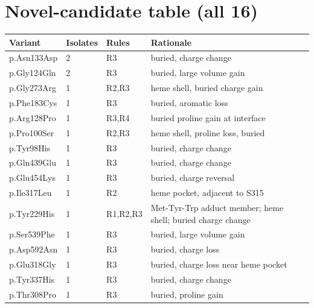 \documentclass[11pt]{article}
\begin{document}
\section{Novel-candidate table (all 16)}
\begin{center}\small
\begin{tabular}{llll}
\hline
Variant & Isolates & Rules & Rationale\\
\hline
p.Asn133Asp & 2 & R3 & buried, charge change\\
p.Gly124Gln & 2 & R3 & buried, large volume gain\\
p.Gly273Arg & 1 & R2,R3 & heme shell, buried charge gain\\
p.Phe183Cys & 1 & R3 & buried, aromatic loss\\
p.Arg128Pro & 1 & R3,R4 & buried proline gain at interface\\
p.Pro100Ser & 1 & R2,R3 & heme shell, proline loss, buried\\
p.Tyr98His & 1 & R3 & buried, charge change\\
p.Gln439Glu & 1 & R3 & buried, charge change\\
p.Glu454Lys & 1 & R3 & buried, charge reversal\\
p.Ile317Leu & 1 & R2 & heme pocket, adjacent to S315\\
p.Tyr229His & 1 & R1,R2,R3 & Met-Tyr-Trp adduct member; heme shell; buried charge change\\
p.Ser539Phe & 1 & R3 & buried, large volume gain\\
p.Asp592Asn & 1 & R3 & buried, charge loss\\
p.Glu318Gly & 1 & R3 & buried, charge loss near heme pocket\\
p.Tyr337His & 1 & R3 & buried, charge change\\
p.Thr308Pro & 1 & R3 & buried, proline gain\\
\hline
\end{tabular}
\end{center}
\end{document}
